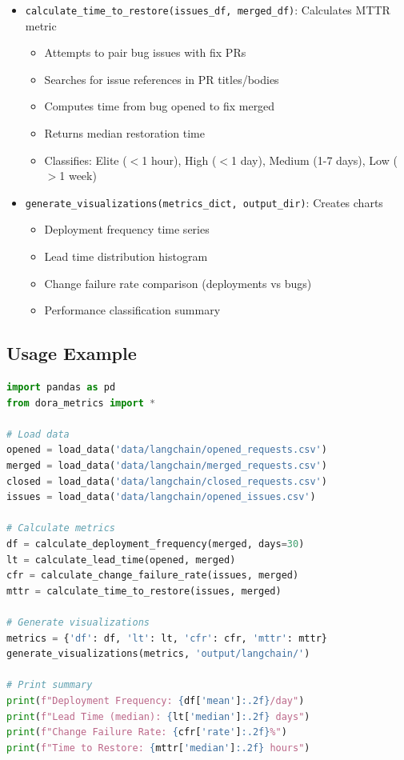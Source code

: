 \begin{itemize}
  \item \texttt{calculate\_time\_to\_restore(issues\_df,
    merged\_df)}: Calculates MTTR metric
    \begin{itemize}
      \item Attempts to pair bug issues with fix PRs
      \item Searches for issue references in PR titles/bodies
      \item Computes time from bug opened to fix merged
      \item Returns median restoration time
      \item Classifies: Elite ($<$1 hour), High ($<$1 day), Medium
        (1-7 days), Low ($>$1 week)
    \end{itemize}

  \item \texttt{generate\_visualizations(metrics\_dict,
    output\_dir)}: Creates charts
    \begin{itemize}
      \item Deployment frequency time series
      \item Lead time distribution histogram
      \item Change failure rate comparison (deployments vs bugs)
      \item Performance classification summary
    \end{itemize}
\end{itemize}

\subsection{Usage Example}

\begin{lstlisting}[language=Python, caption=Running DORA Metrics Analysis]
import pandas as pd
from dora_metrics import *

# Load data
opened = load_data('data/langchain/opened_requests.csv')
merged = load_data('data/langchain/merged_requests.csv')
closed = load_data('data/langchain/closed_requests.csv')
issues = load_data('data/langchain/opened_issues.csv')

# Calculate metrics
df = calculate_deployment_frequency(merged, days=30)
lt = calculate_lead_time(opened, merged)
cfr = calculate_change_failure_rate(issues, merged)
mttr = calculate_time_to_restore(issues, merged)

# Generate visualizations
metrics = {'df': df, 'lt': lt, 'cfr': cfr, 'mttr': mttr}
generate_visualizations(metrics, 'output/langchain/')

# Print summary
print(f"Deployment Frequency: {df['mean']:.2f}/day")
print(f"Lead Time (median): {lt['median']:.2f} days")
print(f"Change Failure Rate: {cfr['rate']:.2f}%")
print(f"Time to Restore: {mttr['median']:.2f} hours")
\end{lstlisting}

